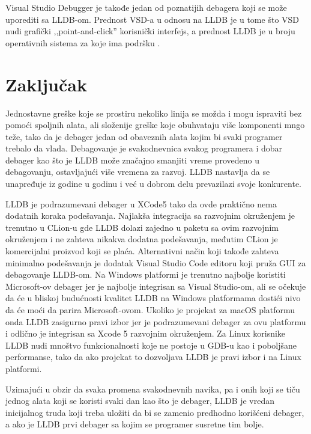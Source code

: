 \documentclass[a4paper]{article}
\begin{document}
Visual Studio Debugger je takođe jedan od poznatijih debagera koji se može uporediti sa LLDB-om. Prednost VSD-a u odnosu na LLDB je u tome što VSD nudi grafički ,,point-and-click'' korisnički interfejs, a prednost LLDB je u broju operativnih sistema za koje ima podršku \cite{vsd}.
\section{Zaključak}
\label{sec:zakljucak}

Jednostavne greške koje se prostiru nekoliko linija se možda i mogu ispraviti bez pomoći spoljnih alata, ali složenije greške koje obuhvataju više komponenti mngo teže, tako da je debager jedan od obaveznih alata kojim bi svaki programer trebalo da vlada.
Debagovanje je svakodnevnica svakog programera i dobar debager kao što je LLDB može značajno smanjiti vreme provedeno u debagovanju, ostavljajući više vremena za razvoj. LLDB nastavlja da se unapređuje iz godine u godinu i već u dobrom delu prevazilazi svoje konkurente.

LLDB je podrazumevani debager u XCode5 tako da ovde praktično nema dodatnih koraka podešavanja. Najlakša integracija sa razvojnim okruženjem je trenutno u CLion-u gde LLDB dolazi zajedno u paketu sa ovim razvojnim okruženjem i ne zahteva nikakva dodatna podešavanja, međutim CLion je komercijalni proizvod koji se plaća. Alternativni način koji takođe zahteva minimalno podešavanja je dodatak Visual Studio Code editoru koji pruža GUI za debagovanje LLDB-om. Na Windows platformi je trenutno najbolje koristiti Microsoft-ov debager jer je najbolje integrisan sa Visual Studio-om, ali se očekuje da će u bliskoj budućnosti kvalitet LLDB na Windows platformama dostići nivo da će moći da parira Microsoft-ovom. Ukoliko je projekat za macOS platformu onda LLDB zasigurno pravi izbor jer je podrazumevani debager za ovu platformu i odlično je integrisan sa Xcode 5 razvojnim okruženjem. Za Linux korisnike LLDB nudi mnoštvo funkcionalnosti koje ne postoje u GDB-u kao i poboljšane performanse, tako da ako projekat to dozvoljava LLDB je pravi izbor i na Linux platformi.
 
Uzimajući u obzir da svaka promena svakodnevnih navika, pa i onih koji se tiču jednog alata koji se koristi svaki dan kao što je debager, LLDB je vredan inicijalnog truda koji treba uložiti da bi se zamenio predhodno korišćeni debager, a ako je LLDB prvi debager sa kojim se programer susretne tim bolje.
\appendix
 

\end{document}
